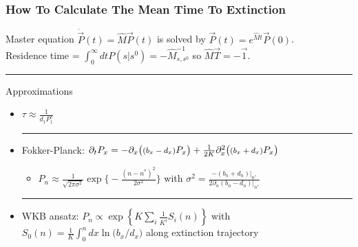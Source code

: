 \documentclass[dvipsnames]{beamer}
\begin{document}


\begin{frame}
\frametitle{How To Calculate The Mean Time To Extinction}
Master equation $\dot{\vec{P}}(t) = \hat{M}\vec{P}(t)$ is solved by $\vec{P}(t)=e^{\hat{M}t}\vec{P}(0)$. \\ %
\pause
\large{
	Residence time = $\int_0^{\infty} dt P(s|s^0)=-\hat{M}^{-1}_{s,s^0}$ so 
	$\boxed{\hat{M}\vec{T}=-\vec{1}}$. \\%
}
\pause
\noindent\rule{10cm}{0.4pt}
\large{Approximations}
\begin{itemize}
	\item $\tau \approx \frac{1}{d_1 P^c_1}$
	\pause
	\\ \noindent\rule{3cm}{0.4pt}
	\item Fokker-Planck: $\partial_t P_x = - \partial_x\big(\text{\footnotesize{$(b_x - d_x)$}} P_x \big) + \frac{1}{2 K} \partial_x^2 \big(\text{\footnotesize{$(b_x + d_x)$}} P_x \big)$
	\begin{itemize}
		\item $P_n \approx \frac{1}{\sqrt{2\pi\sigma^{2}}}\exp\Big\lbrace-\frac{(n-n^*)^2}{2\sigma^{2}}\Big\rbrace$ with $\sigma^2=\frac{-(b_n + d_n)|_{n^*}}{2\partial_n(b_n - d_n)|_{n^*}}$
	\end{itemize}
	\pause
	\noindent\rule{9.5cm}{0.4pt}
	\item WKB ansatz: $P_n \propto \exp \left\{ K \sum_i \frac{1}{K^i}S_i(n) \right\}$ with\\
	$S_0(n) = \frac{1}{K}\int_{0}^{n} dx \ln\big(b_x/d_x\big)$ along extinction trajectory
\end{itemize}
\end{frame}
\end{document}
